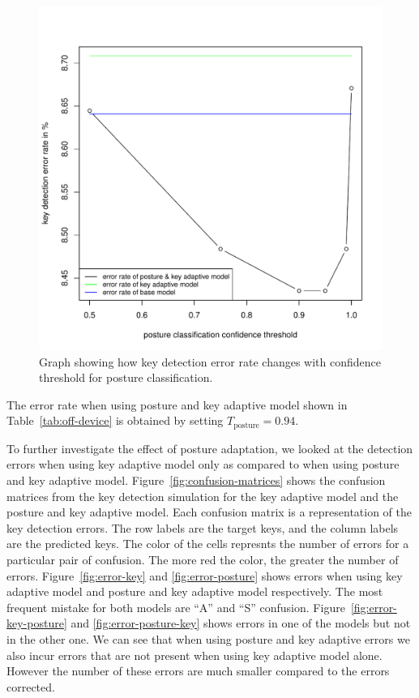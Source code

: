 \documentclass{sigchi}
\begin{document}
\begin{figure}[tb]
 \includegraphics[width=0.9\columnwidth]{figures/error-confidence.pdf}
  \caption{Graph showing how key detection error rate changes with confidence
  threshold for posture classification.}
  \label{fig:posture-confidence}
\end{figure}

The error rate when using posture and key adaptive model shown in Table~\ref{tab:off-device}
is obtained by setting $T_{\text{posture}} = 0.94$.

To further investigate the effect of posture adaptation, we looked at the detection
errors when using key adaptive model only as compared to when using posture and key adaptive model.
Figure~\ref{fig:confusion-matrices} shows the confusion matrices from the key detection
simulation for the key adaptive model and the posture and key adaptive model. Each 
confusion matrix is a representation of the key detection errors. The row labels are
the target keys, and the column labels are the predicted keys. The color of the cells
represnts the number of errors for a particular pair of confusion. The more red the color,
the greater the number of errors. Figure~\ref{fig:error-key} and \ref{fig:error-posture}
shows errors when using key adaptive model and posture and key adaptive model respectively.
The most frequent mistake for both models are ``A'' and ``S'' confusion. Figure~\ref{fig:error-key-posture}
and \ref{fig:error-posture-key} shows errors in one of the models but not in the other one.
We can see that when using posture and key adaptive errors we also incur errors
that are not present when using key adaptive model alone. However the number of these
errors are much smaller compared to the errors corrected.
\end{document}
